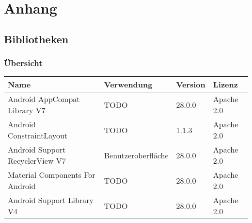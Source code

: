 \section{Anhang}\label{sec:bib}

\subsection{Bibliotheken}\label{subsec:bibliotheken}

\subsubsection{Übersicht}

\begin{tabularx}{\textwidth}{X|l|l|l}
    \textbf{Name} & \textbf{Verwendung} & \textbf{Version} & \textbf{Lizenz} \\
    \hline
    Android AppCompat Library V7 & TODO & 28.0.0 & Apache 2.0\\    %
    Android ConstraintLayout & TODO & 1.1.3 & Apache 2.0\\   %
    Android Support RecyclerView V7 & Benutzeroberfläche & 28.0.0 & Apache 2.0\\      %
    Material Components For Android & TODO & 28.0.0 & Apache 2.0\\  %
    Android Support Library V4 & TODO & 28.0.0 & Apache 2.0\\   %







\end{tabularx}

